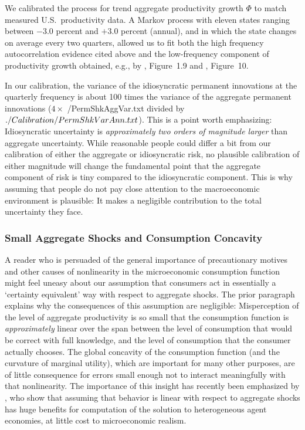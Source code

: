 We calibrated the process for trend aggregate productivity growth $\Phi$ to match measured U.S.\ productivity data.  A Markov process with eleven states ranging between $-3.0$ percent and $+3.0$ percent (annual), and in which the state changes on average every two quarters, allowed us to fit both the high frequency autocorrelation evidence cited above and the low-frequency component of productivity growth obtained, e.g., by \cite{sswNAIRU}, Figure~1.9 and \cite{fernald:disappointingRecovery}, Figure~10.

In our calibration, the variance of the idiosyncratic permanent innovations at the quarterly frequency is about 100 times the variance of the aggregate permanent innovations ($4 \times $ \ParmDir/PermShkAggVar.txt divided by $ ./Calibration/PermShkVarAnn.txt $).  This is a point worth emphasizing: Idiosyncratic uncertainty is {\it approximately two orders of magnitude larger} than aggregate uncertainty.  While reasonable people could differ a bit from our calibration of either the aggregate or idiosyncratic risk, no plausible calibration of either magnitude will change the fundamental point that the aggregate component of risk is tiny compared to the idiosyncratic component.  This is why assuming that people do not pay close attention to the macroeconomic environment is plausible: It makes a negligible contribution to the total uncertainty they face.

\hypertarget{ConcavityAggImp}{}
\subsubsection{Small Aggregate Shocks and Consumption Concavity}
A reader who is persuaded of the general importance of precautionary motives and other causes of nonlinearity in the microeconomic consumption function might feel uneasy about our assumption that consumers act in essentially a `certainty equivalent' way with respect to aggregate shocks.  The prior paragraph explains why the consequences of this assumption are negligible: Misperception of the level of aggregate productivity is so small that the consumption function is \textit{approximately} linear over the span between the level of consumption that would be correct with full knowledge, and the level of consumption that the consumer actually chooses.  The global concavity of the consumption function (and the curvature of marginal utility), which are important for many other purposes, are of little consequence for errors small enough not to interact meaningfully with that nonlinearity.  The importance of this insight has recently been emphasized by \cite{bmpMITshocks}, who show that assuming that behavior is linear with respect to aggregate shocks has huge benefits for computation of the solution to heterogeneous agent economies, at little cost to microeconomic realism.

